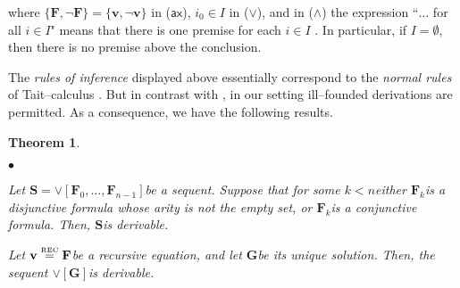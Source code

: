 \documentclass[copyright,creativecommons]{eptcs}
\newcommand{\axi}{\mathsf{ax}}
\newcommand{\eqrec}{\stackrel{\text{\tiny \textnormal{REC}}}{=}}
\newcommand{\bF}{\mathbf{F}}
\newcommand{\bG}{\mathbf{G}}
\newcommand{\bS}{\mathbf{S}}
\newcommand{\bbv}{\mathbf{v}}
\newtheorem{theorem}{Theorem}[section]   \newtheorem{lemma}[theorem]{Lemma}
\theoremstyle{definition}
\newcommand{\sqi}{
 \begin{list}{$\bullet$}
  { \setlength{\itemsep}{0pt}
     \setlength{\parsep}{3pt}
     \setlength{\topsep}{3pt}
     \setlength{\partopsep}{0pt}
     \setlength{\leftmargin}{1.4em}
     \setlength{\labelwidth}{1.5em}
     \setlength{\labelsep}{0.3em} } }
\newcommand{\sqe}{
  \end{list}  }
\begin{document}
\noindent where  $\{ \bF ,  \neg \bF\}
= \{\bbv , \neg \bbv\}$ in  ($\axi$), $i_0 \in I$  in  ($\vee$), and  in  ($\wedge$) the expression
``$\ldots$ for all $i \in I$" means that
 there is one premise for each $i \in I$ .
In particular, if $I = \emptyset$, then
there is no premise above the conclusion.

The \emph{rules of inference} displayed above essentially correspond
to the \emph{normal rules} of Tait--calculus \cite{Tait68}. But in contrast with \cite{Tait68},  in our setting ill--founded derivations
  are permitted. As a consequence, we have the following results.



 \begin{theorem} \label{propder} \label{recder} \hfill
 \sqi
 \item[\emph{(1)}]
 Let \/$\bS =  \vee[\bF_{0}, \ldots, \bF_{n-1}]$\@ be a sequent. Suppose that for some  \/$k < n$\@  either
 \/$\bF_k$\@ is a disjunctive formula whose arity is not the empty set,  or  \/$\bF_k$\@ is a conjunctive formula.
Then,  \/$\bS$\@ is derivable.
\item[\emph{(2)}] Let  \/$\bbv \eqrec \bF$\@ be a recursive equation, and
let \/$\bG$\@ be its  unique solution.
Then, the sequent
\/$\vee[\bG]$\@ is
derivable.
\sqe
 \end{theorem}
\end{document}
